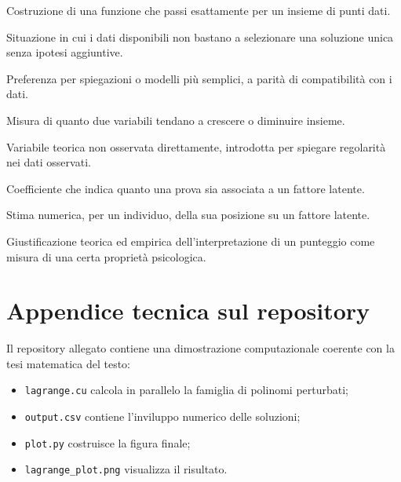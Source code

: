\documentclass[10pt, a4paper]{article}
\theoremstyle{plain}
\theoremstyle{definition}
\theoremstyle{remark}
\begin{document}
\begin{description}[style=nextline, leftmargin=2.7cm]
    \item[Interpolazione]
    Costruzione di una funzione che passi esattamente per un insieme di punti
    dati.

    \item[Sottodeterminazione]
    Situazione in cui i dati disponibili non bastano a selezionare una soluzione
    unica senza ipotesi aggiuntive.

    \item[Parsimonia]
    Preferenza per spiegazioni o modelli più semplici, a parità di compatibilità
    con i dati.

    \item[Correlazione]
    Misura di quanto due variabili tendano a crescere o diminuire insieme.

    \item[Variabile latente]
    Variabile teorica non osservata direttamente, introdotta per spiegare
    regolarità nei dati osservati.

    \item[Loading fattoriale]
    Coefficiente che indica quanto una prova sia associata a un fattore latente.

    \item[Factor score]
    Stima numerica, per un individuo, della sua posizione su un fattore latente.

    \item[Validità di costrutto]
    Giustificazione teorica ed empirica dell'interpretazione di un punteggio come
    misura di una certa proprietà psicologica.
\end{description}

\section*{Appendice tecnica sul repository}

Il repository allegato contiene una dimostrazione computazionale coerente con la
tesi matematica del testo:
\begin{itemize}
    \item \texttt{lagrange.cu} calcola in parallelo la famiglia di polinomi
          perturbati;
    \item \texttt{output.csv} contiene l'inviluppo numerico delle soluzioni;
    \item \texttt{plot.py} costruisce la figura finale;
    \item \texttt{lagrange\_plot.png} visualizza il risultato.
\end{itemize}
\end{document}
